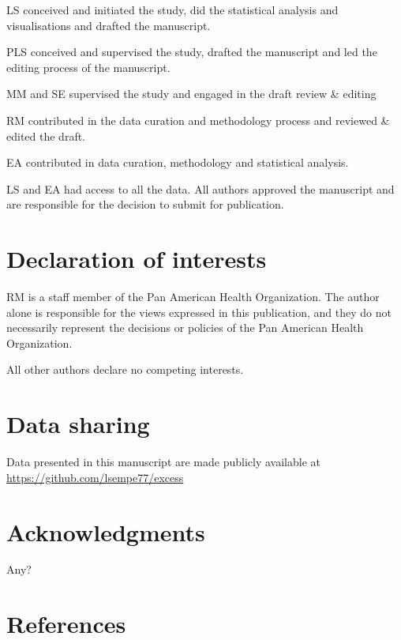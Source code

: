 \documentclass[
]{article}
\begin{document}
LS conceived and initiated the study, did the statistical analysis and visualisations and drafted the manuscript.

PLS conceived and supervised the study, drafted the manuscript and led the editing process of the manuscript.

MM and SE supervised the study and engaged in the draft review \& editing

RM contributed in the data curation and methodology process and reviewed \& edited the draft.

EA contributed in data curation, methodology and statistical analysis.

LS and EA had access to all the data. All authors approved the manuscript and are responsible for the decision to submit for publication.

\hypertarget{declaration-of-interests}{%
\section{Declaration of interests}\label{declaration-of-interests}}

RM is a staff member of the Pan American Health Organization. The author alone is responsible for the views expressed in this publication, and they do not necessarily represent the decisions or policies of the Pan American Health Organization.

All other authors declare no competing interests.

\hypertarget{data-sharing}{%
\section{Data sharing}\label{data-sharing}}

Data presented in this manuscript are made publicly available at \url{https://github.com/lsempe77/excess}

\hypertarget{acknowledgments}{%
\section{Acknowledgments}\label{acknowledgments}}

Any?

\hypertarget{references}{%
\section{References}\label{references}}
\end{document}
